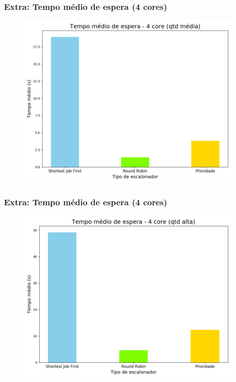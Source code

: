 \documentclass{beamer}
\begin{document}
\begin{frame}
\frametitle{Extra: Tempo médio de espera (4 cores)}
\begin{figure}
\includegraphics[scale=0.4]{avgwt_med_4.png}
\end{figure}
\end{frame}

\begin{frame}
\frametitle{Extra: Tempo médio de espera (4 cores)}
\begin{figure}
\includegraphics[scale=0.4]{avgwt_long_4.png}
\end{figure}
\end{frame}
\end{document}
